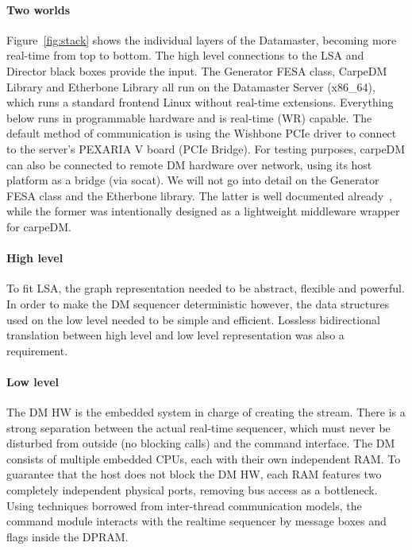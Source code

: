 \paragraph{Two worlds}
Figure~\ref{fig:stack} shows the individual layers of the Datamaster, becoming more real-time from top to bottom. The high level connections to the LSA and Director black boxes provide the input.
The Generator FESA class, CarpeDM Library and Etherbone Library all run on the Datamaster Server (x86\_64), which runs a standard frontend Linux without real-time extensions. Everything below runs in programmable hardware and is real-time (WR) capable. The default method of communication is using the Wishbone PCIe driver to connect to the server's PEXARIA V board (PCIe Bridge). For testing purposes, carpeDM can also be connected to remote DM hardware over network, using its host platform as a bridge (via socat). We will not go into detail on the Generator FESA class and the Etherbone library. The latter is well documented already~\cite{123}, while the former was intentionally designed as a lightweight middleware wrapper for carpeDM.
\paragraph{High level}
To fit LSA, the graph representation needed to be abstract, flexible and powerful. In order to make the DM sequencer deterministic however, the data structures used on the low level needed to be simple and efficient.
Lossless bidirectional translation between high level and low level representation was also a requirement.
\paragraph{Low level}
The DM HW is the embedded system in charge of creating the stream. There is a strong separation between the actual real-time sequencer,
which must never be disturbed from outside (no blocking calls) and the command interface. The DM consists of multiple embedded CPUs, each with their own independent RAM. To guarantee that the host does not block the DM HW, each RAM features two completely independent physical ports, removing bus access as a bottleneck. Using techniques borrowed from inter-thread communication models, the command module interacts with the realtime sequencer by message boxes and flags inside the DPRAM.
